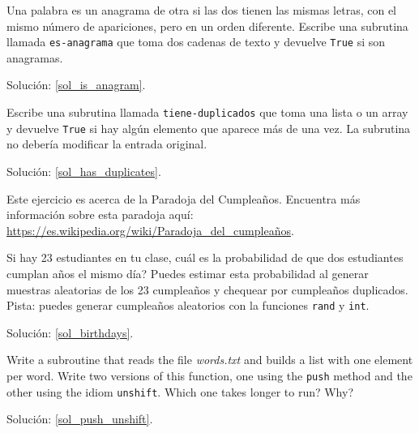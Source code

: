 \begin{exercise}

\label{is_anagram}
Una palabra es un anagrama de otra si las dos tienen las mismas letras, 
con el mismo número de apariciones, pero en un orden diferente.
Escribe una subrutina llamada \verb|es-anagrama| que toma dos
cadenas de texto y devuelve {\tt True} si son anagramas.

Solución: \ref{sol_is_anagram}.

\end{exercise}



\begin{exercise}
\label{has_duplicates}

Escribe una subrutina llamada \verb|tiene-duplicados| que toma
una lista o un array  y devuelve {\tt True} si hay algún elemento
que aparece más de una vez. La subrutina no debería
modificar la entrada original.

Solución: \ref{sol_has_duplicates}.

\end{exercise}


\begin{exercise}

Este ejercicio es acerca de la Paradoja del Cumpleaños.
Encuentra más información sobre esta paradoja aquí: 
\url{https://es.wikipedia.org/wiki/Paradoja_del_cumpleaños}.
\label{birthdays}

Si hay 23 estudiantes en tu clase, cuál es la probabilidad
de que dos estudiantes cumplan años el mismo día? 
Puedes estimar esta probabilidad al generar muestras 
aleatorias de los 23 cumpleaños y chequear por 
cumpleaños duplicados. Pista: puedes generar cumpleaños 
aleatorios con la funciones {\tt rand} y {\tt int}.

Solución: \ref{sol_birthdays}.

\end{exercise}



\begin{exercise}

\label{push_unshift}
Write a subroutine that reads the file \emph{words.txt} and builds
a list with one element per word.  Write two versions of
this function, one using the {\tt push} method and the
other using the idiom {\tt unshift}.  Which one takes
longer to run?  Why?

Solución: \ref{sol_push_unshift}.


\end{exercise}


